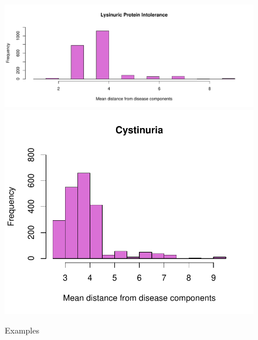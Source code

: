 \begin{figure}[h!]
    \includegraphics[scale=0.2]{Images/Lisinuric Protein Intolerance.pdf}
    \includegraphics[scale=0.2]{Images/Cystinuria.pdf}
    \caption{Examples}
    \label{fig:results}
\end{figure}
\FloatBarrier